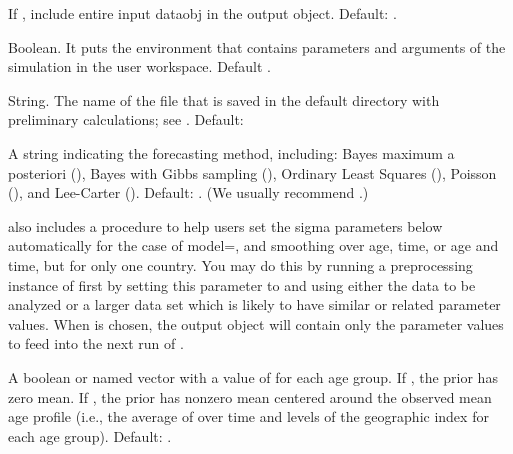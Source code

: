 \begin{Arguments}
\begin{ldescription}
\item[\code{model.frame}] If , include entire input dataobj in the output
object. Default: .

\item[\code{debug}] Boolean.  It puts the
environment that contains parameters and arguments of the
simulation in the user workspace. Default .

\item[\code{rerun}] String. The name of the file that is saved in the default
directory with preliminary calculations; see
. Default: 

\item[\code{model}] A string indicating the forecasting method, including:
Bayes maximum a posteriori (), Bayes with Gibbs sampling
(), Ordinary Least Squares (), Poisson
(), and Lee-Carter (). Default: .
(We usually recommend .)

 also includes a procedure to help users set the sigma
parameters below automatically for the case of model=, and
smoothing over age, time, or age and time, but for only one
country. You may do this by running a preprocessing instance of
 first by setting this parameter to  and using
either the data to be analyzed or a larger data set which is likely
to have similar or related parameter values. When  is chosen,
the  output object will contain only the parameter values to
feed into the next run of .

\item[\code{zero.mean}] A boolean or named vector with a value of \eqn{ \bar\mu}{}
for each age group. If , the prior has zero mean. If , the
prior has nonzero mean centered around the observed mean age profile
(i.e., the average of  over time and levels of the geographic
index for each age group). Default: .


\end{ldescription}
\end{Arguments}
